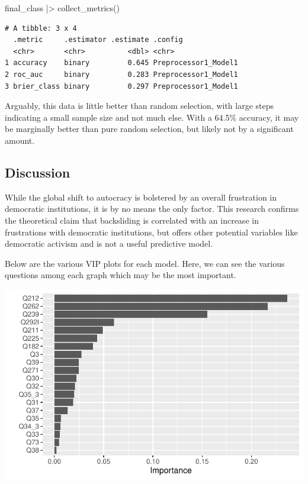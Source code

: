 \documentclass[
  letterpaper,
  DIV=11,
  numbers=noendperiod]{scrartcl}
\newenvironment{Shaded}{\begin{snugshade}}{\end{snugshade}}
\newcommand{\FunctionTok}[1]{\textcolor[rgb]{0.28,0.35,0.67}{#1}}
\newcommand{\NormalTok}[1]{\textcolor[rgb]{0.00,0.23,0.31}{#1}}
\newcommand{\SpecialCharTok}[1]{\textcolor[rgb]{0.37,0.37,0.37}{#1}}
\begin{document}
\begin{Shaded}
\begin{Highlighting}[]
\NormalTok{final\_class }\SpecialCharTok{|\textgreater{}} \FunctionTok{collect\_metrics}\NormalTok{()}
\end{Highlighting}
\end{Shaded}

\begin{verbatim}
# A tibble: 3 x 4
  .metric     .estimator .estimate .config             
  <chr>       <chr>          <dbl> <chr>               
1 accuracy    binary         0.645 Preprocessor1_Model1
2 roc_auc     binary         0.283 Preprocessor1_Model1
3 brier_class binary         0.297 Preprocessor1_Model1
\end{verbatim}

Arguably, this data is little better than random selection, with large
steps indicating a small sample size and not much else. With a 64.5\%
accuracy, it may be marginally better than pure random selection, but
likely not by a significant amount.

\subsection{Discussion}\label{discussion}

While the global shift to autocracy is bolstered by an overall
frustration in democratic institutions, it is by no means the only
factor. This research confirms the theoretical claim that backsliding is
correlated with an increase in frustrations with democratic
institutions, but offers other potential variables like democratic
activism and is not a useful predictive model.

Below are the various VIP plots for each model. Here, we can see the
various questions among each graph which may be the most important.

\includegraphics{Episode_2_files/figure-pdf/vip-1.pdf}
\end{document}
